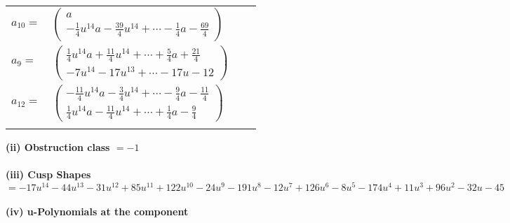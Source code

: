 \documentclass[1p]{elsarticle_modified}
\theoremstyle{definition}
\begin{document}
\begin{tabular}{m{7pt} m{180pt} m{7pt} m{180pt} }
\flushright $a_{10}=$&$\begin{pmatrix}a\\-\frac{1}{4} u^{14} a-\frac{39}{4} u^{14}+\cdots-\frac{1}{4} a-\frac{69}{4}\end{pmatrix}$ \\
\flushright $a_{9}=$&$\begin{pmatrix}\frac{1}{4} u^{14} a+\frac{11}{4} u^{14}+\cdots+\frac{5}{4} a+\frac{21}{4}\\-7 u^{14}-17 u^{13}+\cdots-17 u-12\end{pmatrix}$ \\
\flushright $a_{12}=$&$\begin{pmatrix}-\frac{11}{4} u^{14} a-\frac{3}{4} u^{14}+\cdots-\frac{9}{4} a-\frac{11}{4}\\\frac{1}{4} u^{14} a-\frac{11}{4} u^{14}+\cdots+\frac{1}{4} a-\frac{9}{4}\end{pmatrix}$\\&\end{tabular}
\flushleft \textbf{(ii) Obstruction class $= -1$}\\~\\
\flushleft \textbf{(iii) Cusp Shapes $= -17 u^{14}-44 u^{13}-31 u^{12}+85 u^{11}+122 u^{10}-24 u^9-191 u^8-12 u^7+126 u^6-8 u^5-174 u^4+11 u^3+96 u^2-32 u-45$}\\~\\
\newpage\renewcommand{\arraystretch}{1}
\flushleft \textbf{(iv) u-Polynomials at the component}\newline \\
\end{document}

